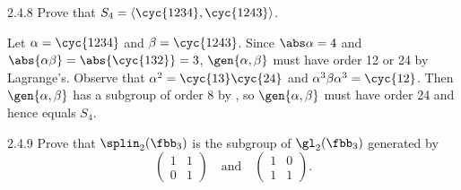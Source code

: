 \begin{exercise}{2.4.8} 
    Prove that $S_4 = \langle \cyc{1 2 3 4}, \cyc{1 2 4 3}\rangle$.
\end{exercise}

\begin{sol}
    Let $\alpha = \cyc{1 2 3 4}$ and $\beta = \cyc{1 2 4 3}$.
	Since $\abs\alpha = 4$ and $\abs{\alpha\beta} = \abs{\cyc{1 3 2}} = 3$, $\gen{\alpha, \beta}$ must have order 12 or 24 by Lagrange's.
	Observe that $\alpha^2 = \cyc{1 3}\cyc{2 4}$ and $\alpha^3\beta\alpha^3 = \cyc{1 2}$.
	Then $\gen{\alpha, \beta}$ has a subgroup of order 8 by , so $\gen{\alpha, \beta}$ must have order 24 and hence equals $S_4$.
\end{sol}

\begin{exercise}{2.4.9}
    Prove that $\splin_2(\fbb_3)$ is the subgroup of $\gl_2(\fbb_3)$ generated by  
    \[
        \begin{pmatrix}
            1 & 1 \\ 
            0 & 1
        \end{pmatrix} \quad \text{and} \quad
        \begin{pmatrix}
            1 & 0 \\ 
            1 & 1
        \end{pmatrix}.
    \]
\end{exercise}

